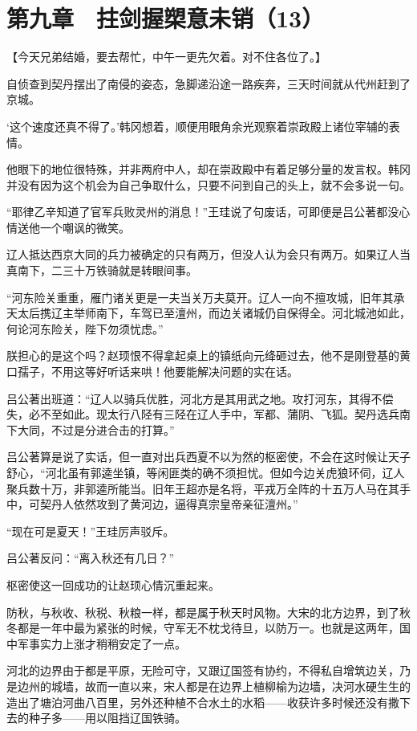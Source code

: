 \section{第九章　拄剑握槊意未销（13）}

【今天兄弟结婚，要去帮忙，中午一更先欠着。对不住各位了。】

自侦查到契丹摆出了南侵的姿态，急脚递沿途一路疾奔，三天时间就从代州赶到了京城。

‘这个速度还真不得了。’韩冈想着，顺便用眼角余光观察着崇政殿上诸位宰辅的表情。

他眼下的地位很特殊，并非两府中人，却在崇政殿中有着足够分量的发言权。韩冈并没有因为这个机会为自己争取什么，只要不问到自己的头上，就不会多说一句。

“耶律乙辛知道了官军兵败灵州的消息！”王珪说了句废话，可即便是吕公著都没心情送他一个嘲讽的微笑。

辽人抵达西京大同的兵力被确定的只有两万，但没人认为会只有两万。如果辽人当真南下，二三十万铁骑就是转眼间事。

“河东险关重重，雁门诸关更是一夫当关万夫莫开。辽人一向不擅攻城，旧年其承天太后携辽主举师南下，车驾已至澶州，而边关诸城仍自保得全。河北城池如此，何论河东险关，陛下勿须忧虑。”

朕担心的是这个吗？赵顼恨不得拿起桌上的镇纸向元绛砸过去，他不是刚登基的黄口孺子，不用这等好听话来哄！他要能解决问题的实在话。

吕公著出班道：“辽人以骑兵优胜，河北方是其用武之地。攻打河东，其得不偿失，必不至如此。现太行八陉有三陉在辽人手中，军都、蒲阴、飞狐。契丹选兵南下大同，不过是分进合击的打算。”

吕公著算是说了实话，但一直对出兵西夏不以为然的枢密使，不会在这时候让天子舒心，“河北虽有郭逵坐镇，等闲匪类的确不须担忧。但如今边关虎狼环伺，辽人聚兵数十万，非郭逵所能当。旧年王超亦是名将，平戎万全阵的十五万人马在其手中，可契丹人依然攻到了黄河边，逼得真宗皇帝亲征澶州。”

“现在可是夏天！”王珪厉声驳斥。

吕公著反问：“离入秋还有几日？”

枢密使这一回成功的让赵顼心情沉重起来。

防秋，与秋收、秋税、秋粮一样，都是属于秋天时风物。大宋的北方边界，到了秋冬都是一年中最为紧张的时候，守军无不枕戈待旦，以防万一。也就是这两年，国中军事实力上涨才稍稍安定了一点。

河北的边界由于都是平原，无险可守，又跟辽国签有协约，不得私自增筑边关，乃是边州的城墙，故而一直以来，宋人都是在边界上植柳榆为边墙，决河水硬生生的造出了塘泊河曲八百里，另外还种植不合水土的水稻——收获许多时候还没有撒下去的种子多——用以阻挡辽国铁骑。

